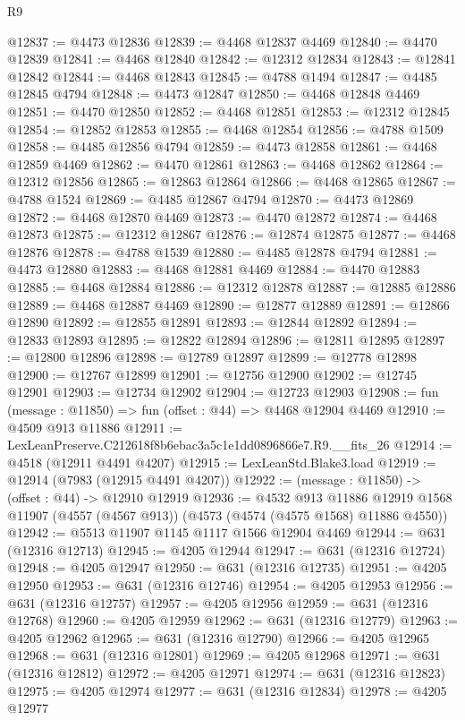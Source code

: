 \begin{lexlean}{R9}
\begin{coremodule}
@12837 := @4473 @12836
@12839 := @4468 @12837 @4469
@12840 := @4470 @12839
@12841 := @4468 @12840
@12842 := @12312 @12834
@12843 := @12841 @12842
@12844 := @4468 @12843
@12845 := @4788 @1494
@12847 := @4485 @12845 @4794
@12848 := @4473 @12847
@12850 := @4468 @12848 @4469
@12851 := @4470 @12850
@12852 := @4468 @12851
@12853 := @12312 @12845
@12854 := @12852 @12853
@12855 := @4468 @12854
@12856 := @4788 @1509
@12858 := @4485 @12856 @4794
@12859 := @4473 @12858
@12861 := @4468 @12859 @4469
@12862 := @4470 @12861
@12863 := @4468 @12862
@12864 := @12312 @12856
@12865 := @12863 @12864
@12866 := @4468 @12865
@12867 := @4788 @1524
@12869 := @4485 @12867 @4794
@12870 := @4473 @12869
@12872 := @4468 @12870 @4469
@12873 := @4470 @12872
@12874 := @4468 @12873
@12875 := @12312 @12867
@12876 := @12874 @12875
@12877 := @4468 @12876
@12878 := @4788 @1539
@12880 := @4485 @12878 @4794
@12881 := @4473 @12880
@12883 := @4468 @12881 @4469
@12884 := @4470 @12883
@12885 := @4468 @12884
@12886 := @12312 @12878
@12887 := @12885 @12886
@12889 := @4468 @12887 @4469
@12890 := @12877 @12889
@12891 := @12866 @12890
@12892 := @12855 @12891
@12893 := @12844 @12892
@12894 := @12833 @12893
@12895 := @12822 @12894
@12896 := @12811 @12895
@12897 := @12800 @12896
@12898 := @12789 @12897
@12899 := @12778 @12898
@12900 := @12767 @12899
@12901 := @12756 @12900
@12902 := @12745 @12901
@12903 := @12734 @12902
@12904 := @12723 @12903
@12908 := fun (message : @11850) => fun (offset : @44) => @4468 @12904 @4469
@12910 := @4509 @913 @11886
@12911 := LexLeanPreserve.C212618f8b6ebac3a5c1e1dd0896866e7.R9.__fits_26
@12914 := @4518 (@12911 @4491 @4207)
@12915 := LexLeanStd.Blake3.load
@12919 := @12914 (@7983 (@12915 @4491 @4207))
@12922 := (message : @11850) -> (offset : @44) -> @12910 @12919
@12936 := @4532
    @913
    @11886
    @12919
    @1568
    @11907
    (@4557 (@4567 @913))
    (@4573 (@4574 (@4575 @1568) @11886 @4550))
@12942 := @5513 @11907 @1145 @1117 @1566 @12904 @4469
@12944 := @631 (@12316 @12713)
@12945 := @4205 @12944
@12947 := @631 (@12316 @12724)
@12948 := @4205 @12947
@12950 := @631 (@12316 @12735)
@12951 := @4205 @12950
@12953 := @631 (@12316 @12746)
@12954 := @4205 @12953
@12956 := @631 (@12316 @12757)
@12957 := @4205 @12956
@12959 := @631 (@12316 @12768)
@12960 := @4205 @12959
@12962 := @631 (@12316 @12779)
@12963 := @4205 @12962
@12965 := @631 (@12316 @12790)
@12966 := @4205 @12965
@12968 := @631 (@12316 @12801)
@12969 := @4205 @12968
@12971 := @631 (@12316 @12812)
@12972 := @4205 @12971
@12974 := @631 (@12316 @12823)
@12975 := @4205 @12974
@12977 := @631 (@12316 @12834)
@12978 := @4205 @12977

\end{coremodule}
\end{lexlean}

